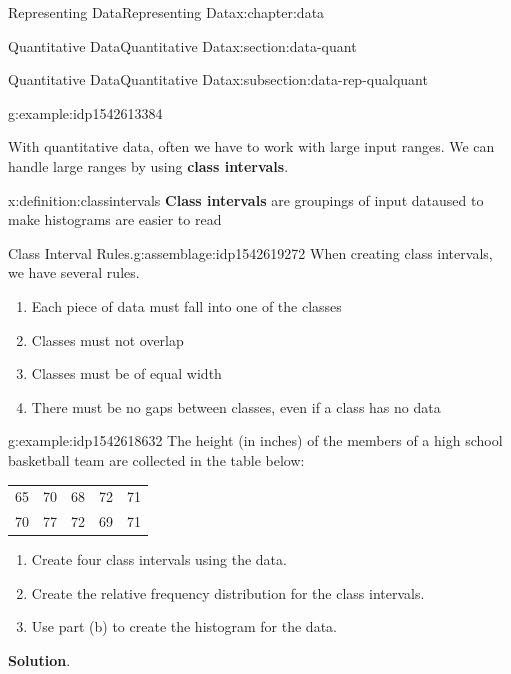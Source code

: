 \documentclass[oneside,10pt,]{book}
\newcommand{\blocktitlefont}{\relax}
\newcommand{\tabularfont}{\relax}
\newcommand{\terminology}[1]{\textbf{#1}}
\begin{document}
\begin{chapterptx}{Representing Data}{}{Representing Data}{}{}{x:chapter:data}
\begin{sectionptx}{Quantitative Data}{}{Quantitative Data}{}{}{x:section:data-quant}
\begin{subsectionptx}{Quantitative Data}{}{Quantitative Data}{}{}{x:subsection:data-rep-qualquant}
\begin{example}{}{g:example:idp1542613384}
\begin{image}{0}{1}{0}
{
}%
\end{image}%
%
\end{example}
With quantitative data, often we have to work with large input ranges.  We can handle large ranges by using \terminology{class intervals}.%
\begin{definition}{}{x:definition:classintervals}%
\terminology{Class intervals} are groupings of input dataused to make histograms are easier to read%
\end{definition}
\begin{assemblage}{Class Interval Rules.}{g:assemblage:idp1542619272}%
When creating class intervals, we have several rules.%
\par
%
\begin{enumerate}[label=\alph*]
\item{}Each piece of data must fall into one of the classes%
\item{}Classes must not overlap%
\item{}Classes must be of equal width%
\item{}There must be no gaps between classes, even if a class has no data%
\end{enumerate}
%
\end{assemblage}
\begin{example}{}{g:example:idp1542618632}%
The height (in inches) of the members of a high school basketball team are collected in the table below:%
\par
\begin{center}%
{\tabularfont%
\begin{tabular}{lllll}
65&70&68&72&71\tabularnewline[0pt]
70&77&72&69&71
\end{tabular}
}%
\end{center}%
%
\par
%
\begin{enumerate}
\item{}Create four class intervals using the data.%
\item{}Create the relative frequency distribution for the class intervals.%
\item{}Use part (b) to create the histogram for the data.%
\end{enumerate}
%
\par\smallskip%
\noindent\textbf{\blocktitlefont Solution}.\hypertarget{g:solution:idp1542626568}{}\quad{}%

\end{example}
\end{subsectionptx}
\end{sectionptx}
\end{chapterptx}
\end{document}
